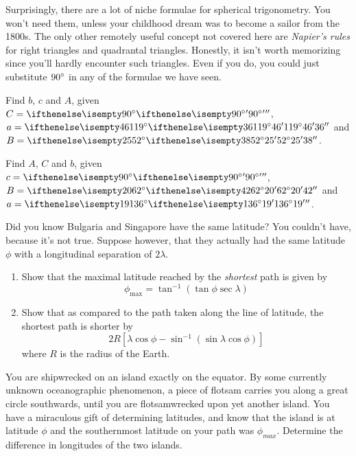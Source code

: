 \documentclass{article}
\begin{document}
Surprisingly, there are a lot of niche formulae for spherical trigonometry. You won't need them, unless your childhood dream was to become a sailor from the 1800s. The only other remotely useful concept not covered here are \textit{Napier's rules} for right triangles and quadrantal triangles. Honestly, it isn't worth memorizing since you'll hardly encounter such triangles. Even if you do, you could just substitute $90{}^{\circ}$ in any of the formulae we have seen.

\begin{Exercise}
Find $b$, $c$ and $A$, given $C=\sexg{90}{}{}$, $a=\sexg{119}{46}{36}$ and $B=\sexg{52}{25}{38}$.
\end{Exercise}
\begin{Answer}
\end{Answer}
\begin{Exercise}
Find $A$, $C$ and $b$, given $c=\sexg{90}{}{}$, $B=\sexg{62}{20}{42}$ and $a=\sexg{136}{19}{}$.
\end{Exercise}
\begin{Answer}
\end{Answer}
\begin{Exercise}
Did you know Bulgaria and Singapore have the same latitude? You couldn't have, because it's not true. Suppose however, that they actually had the same latitude $\phi$ with a longitudinal separation of $2\lambda$.
\begin{enumerate}[label=(\roman*)]
    \item Show that the maximal latitude reached by the \textit{shortest} path is given by
        \begin{equation*}
            \phi_{\mathrm{max}} = \tan^{-1} \left(\tan \phi \sec \lambda \right)
        \end{equation*}
    \item Show that as compared to the path taken along the line of latitude, the shortest path is shorter by
        \begin{equation*}
            2 R \left[ \lambda \cos \phi - \sin^{-1}\left( \sin \lambda \cos \phi \right) \right]
        \end{equation*}
    where $R$ is the radius of the Earth.
\end{enumerate}
\end{Exercise}
\begin{Exercise}
    You are shipwrecked on an island exactly on the equator. By some currently unknown oceanographic phenomenon, a piece of flotsam carries you along a great circle southwards, until you are flotsamwrecked upon yet another island. You have a miraculous gift of determining latitudes, and know that the island is at latitude $\phi$ and the southernmost latitude on your path was $\phi_{max}$. Determine the difference in longitudes of the two islands.
\end{Exercise}
\begin{Answer}
\end{Answer}
\end{document}
